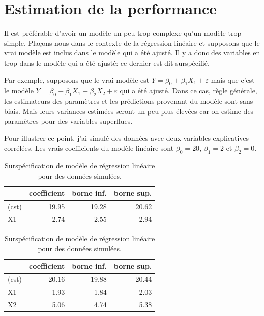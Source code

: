 \documentclass[
  11pt,
  letterpaper,
]{scrbook}
\theoremstyle{definition}
\theoremstyle{remark}
\begin{document}
\hypertarget{estimation-de-la-performance}{%
\section{Estimation de la
performance}\label{estimation-de-la-performance}}

Il est préférable d'avoir un modèle un peu trop complexe qu'un modèle
trop simple. Plaçons-nous dans le contexte de la régression linéaire et
supposons que le vrai modèle est inclus dans le modèle qui a été ajusté.
Il y a donc des variables en trop dans le modèle qui a été ajusté: ce
dernier est dit surspécifié.

Par exemple, supposons que le vrai modèle est
\(Y=\beta_0+\beta_1X_1+\varepsilon\) mais que c'est le modèle
\(Y=\beta_0+\beta_1X_1+\beta_2X_2+\varepsilon\) qui a été ajusté. Dans
ce cas, règle générale, les estimateurs des paramètres et les
prédictions provenant du modèle sont sans biais. Mais leurs variances
estimées seront un peu plus élevées car on estime des paramètres pour
des variables superflues.

Pour illustrer ce point, j'ai simulé des données avec deux variables
explicatives corrélées. Les vrais coefficients du modèle linéaire sont
\(\beta_0 = 20\), \(\beta_1=2\) et \(\beta_2 = 0\).

\begin{table}

\caption{\label{tbl-specification}Surspécification de modèle de
régression linéaire pour des données
simulées.}\begin{minipage}[t]{\linewidth}

{\centering 

\centering
\begin{tabular}[t]{lrrr}
\toprule
  & coefficient & borne inf. & borne sup.\\
\midrule
(cst) & 19.95 & 19.28 & 20.62\\
X1 & 2.74 & 2.55 & 2.94\\
\bottomrule
\end{tabular}

}

\end{minipage}%
\newline
\begin{minipage}[t]{\linewidth}

{\centering 

\centering
\begin{tabular}[t]{lrrr}
\toprule
  & coefficient & borne inf. & borne sup.\\
\midrule
(cst) & 20.16 & 19.88 & 20.44\\
X1 & 1.93 & 1.84 & 2.03\\
X2 & 5.06 & 4.74 & 5.38\\
\bottomrule
\end{tabular}

}

\end{minipage}%

\end{table}
\end{document}
